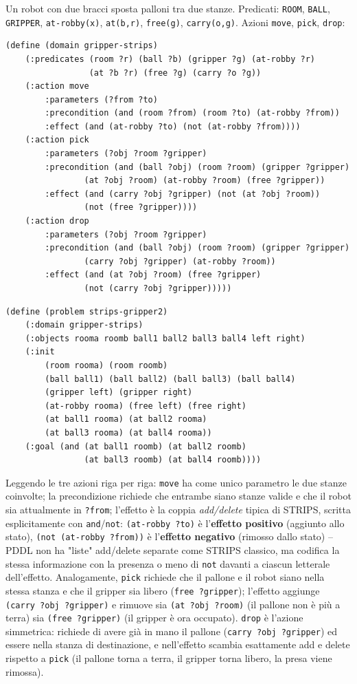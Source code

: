 \documentclass[a4paper,11pt]{article}
\begin{document}
Un robot con due bracci sposta palloni tra due stanze. Predicati: \texttt{ROOM}, \texttt{BALL}, \texttt{GRIPPER}, \texttt{at-robby(x)}, \texttt{at(b,r)}, \texttt{free(g)}, \texttt{carry(o,g)}. Azioni \texttt{move}, \texttt{pick}, \texttt{drop}:
\begin{lstlisting}
(define (domain gripper-strips)
    (:predicates (room ?r) (ball ?b) (gripper ?g) (at-robby ?r)
                 (at ?b ?r) (free ?g) (carry ?o ?g))
    (:action move
        :parameters (?from ?to)
        :precondition (and (room ?from) (room ?to) (at-robby ?from))
        :effect (and (at-robby ?to) (not (at-robby ?from))))
    (:action pick
        :parameters (?obj ?room ?gripper)
        :precondition (and (ball ?obj) (room ?room) (gripper ?gripper)
                (at ?obj ?room) (at-robby ?room) (free ?gripper))
        :effect (and (carry ?obj ?gripper) (not (at ?obj ?room))
                (not (free ?gripper))))
    (:action drop
        :parameters (?obj ?room ?gripper)
        :precondition (and (ball ?obj) (room ?room) (gripper ?gripper)
                (carry ?obj ?gripper) (at-robby ?room))
        :effect (and (at ?obj ?room) (free ?gripper)
                (not (carry ?obj ?gripper)))))
\end{lstlisting}
\begin{lstlisting}
(define (problem strips-gripper2)
    (:domain gripper-strips)
    (:objects rooma roomb ball1 ball2 ball3 ball4 left right)
    (:init
        (room rooma) (room roomb)
        (ball ball1) (ball ball2) (ball ball3) (ball ball4)
        (gripper left) (gripper right)
        (at-robby rooma) (free left) (free right)
        (at ball1 rooma) (at ball2 rooma)
        (at ball3 rooma) (at ball4 rooma))
    (:goal (and (at ball1 roomb) (at ball2 roomb)
                (at ball3 roomb) (at ball4 roomb))))
\end{lstlisting}

Leggendo le tre azioni riga per riga: \texttt{move} ha come unico parametro le due stanze coinvolte; la precondizione richiede che entrambe siano stanze valide e che il robot sia attualmente in \texttt{?from}; l'effetto è la coppia \emph{add/delete} tipica di STRIPS, scritta esplicitamente con \texttt{and}/\texttt{not}: \texttt{(at-robby ?to)} è l'\textbf{effetto positivo} (aggiunto allo stato), \texttt{(not (at-robby ?from))} è l'\textbf{effetto negativo} (rimosso dallo stato) -- PDDL non ha "liste" add/delete separate come STRIPS classico, ma codifica la stessa informazione con la presenza o meno di \texttt{not} davanti a ciascun letterale dell'effetto. Analogamente, \texttt{pick} richiede che il pallone e il robot siano nella stessa stanza e che il gripper sia libero (\texttt{free ?gripper}); l'effetto aggiunge \texttt{(carry ?obj ?gripper)} e rimuove sia \texttt{(at ?obj ?room)} (il pallone non è più a terra) sia \texttt{(free ?gripper)} (il gripper è ora occupato). \texttt{drop} è l'azione simmetrica: richiede di avere già in mano il pallone (\texttt{carry ?obj ?gripper}) ed essere nella stanza di destinazione, e nell'effetto scambia esattamente add e delete rispetto a \texttt{pick} (il pallone torna a terra, il gripper torna libero, la presa viene rimossa).
\end{document}
